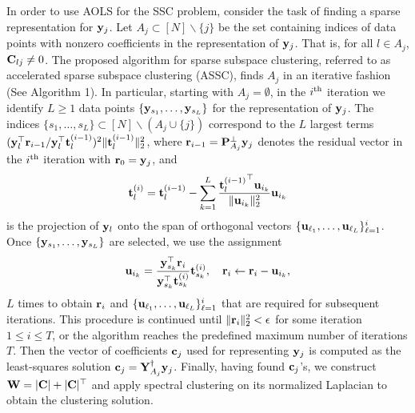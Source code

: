 In order to use AOLS for the SSC problem, consider the task of finding a sparse representation for ${\mathbf y}_j$. Let $A_j\subset[N]\backslash\{j\}$ be the set containing indices of data points with nonzero coefficients in the representation of ${\mathbf y}_j$. That is, for all $l\in A_j$, ${\mathbf C}_{lj}\neq 0$. The proposed algorithm for sparse subspace clustering, referred to as accelerated sparse subspace clustering (ASSC), finds $A_j$ in an iterative fashion (See Algorithm 1). In particular, starting with $A_j=\emptyset$, in the $i\textsuperscript{th}$ iteration we identify $L\geq 1$ data points $\{{\mathbf y}_{s_1},\dots,{\mathbf y}_{s_L}\}$ for the representation of ${\mathbf y}_j$. The indices $\{{s_1},\dots,{s_L}\} \subset [N]\backslash(A_j\cup\{j\})$ correspond to the $L$ largest terms $({\mathbf y}_l^\top {\mathbf r}_{i-1}\slash {\mathbf y}_l^\top {\mathbf t}_l^{(i-1)})^2\|{\mathbf t}_l^{(i-1)}\|_2^2$, where ${\mathbf r}_{i-1} = {\mathbf P}_{A_j}^{\bot}{\mathbf y}_j$ denotes the residual vector in the $i\textsuperscript{th}$ iteration with ${\mathbf r}_0 = {\mathbf y}_j$, and 
\begin{equation}
{\mathbf t}_l^{(i)} ={\mathbf t}_l^{(i-1)} -   \sum_{k = 1}^{L}\frac{{{\mathbf t}_l^{(i-1)}}^\top{\mathbf u}_{i_k}}{\|{\mathbf u}_{i_k}\|_2^2}{\mathbf u}_{i_k}
\end{equation}
is the projection of ${\mathbf y}_l$ onto the span of orthogonal vectors 
$\{{\mathbf u}_{\ell_1},\dots,{\mathbf u}_{\ell_L}\}_{\ell=1}^{i}$. Once $\{{\mathbf y}_{s_1},\dots,{\mathbf y}_{s_L}\}$ are selected, we use the assignment
\begin{equation}\label{eq:update}
{\mathbf u}_{i_{k}} = \frac{{\mathbf y}_{s_k}^\top {\mathbf r}_i}{{\mathbf y}_{s_k}^\top {\mathbf t}_{s_k}^{(i)}}{\mathbf t}_{s_k}^{(i)},\quad {\mathbf r}_{i} \leftarrow {\mathbf r}_i - {\mathbf u}_{i_{k}},
\end{equation}
$L$ times to obtain ${\mathbf r}_{i}$ and $\{{\mathbf u}_{\ell_1},\dots,{\mathbf u}_{\ell_L}\}_{\ell=1}^{i}$ that are required for subsequent iterations. This procedure is continued until $\|{\mathbf r}_i\|_2^2< \epsilon$ for some iteration $1\leq i\leq T$, or the algorithm reaches the predefined maximum number of iterations $T$.  Then the vector of coefficients ${\mathbf c}_j$ used for representing ${\mathbf y}_j$ is computed as the least-squares solution ${\mathbf c}_j={\mathbf Y}_{A_j}^{\dagger}{\mathbf y}_j$. Finally, having found ${\mathbf c}_j$'s, we construct ${\mathbf W} = |{\mathbf C}|+|{\mathbf C}|^\top$ and apply spectral clustering on its normalized Laplacian to obtain the clustering solution.
\renewcommand\algorithmicdo{}	%
